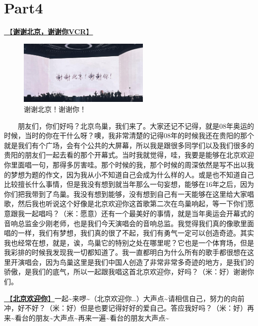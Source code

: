 \documentclass[]{ctexbook}
\begin{document}
\section{Part4}\label{beijing-20240921-part4}

\hyperref[thank-you-vcr]{🎥【\textbf{谢谢北京，谢谢你VCR}】}

\begin{figure}

{\centering \includegraphics[width=180pt]{img/beijing20240921/thank-beijing} 

}

\caption{谢谢北京！谢谢你！}\label{fig:unnamed-chunk-83}
\end{figure}

  朋友们，你们好吗？北京鸟巢，我们来了。大家还记不记得，就是08年奥运的时候，当时的你在干什么呀？噢，我非常清楚的记得08年的时候我还在贵阳的那个就是我们有个广场，会有个公共的大屏幕，所以我是跟很多同学们以及我们很多的贵阳的朋友们一起去看的那个开幕式。当时我就觉得，哇，我要是能够在北京欢迎你里面唱一句，那得多厉害哇。那个时候的我，那个时候的周深依然是写不出以我的梦想为题的作文，因为我从小不知道自己会成为什么样的人。或是也不知道自己比较擅长什么事情，但是我没有想到就当年那么一句妄想，能够在16年之后，因为你们把我带到了鸟巢。我没有想到能够，没有想到自己有一天能够在这里给大家唱歌，然后我也听说这个好像是北京欢迎你这首歌第二次在鸟巢响起，等一下你们愿意跟我一起唱吗？（米：愿意）还有一个最美好的事情，就是当年奥运会开幕式的音响总监金少刚老师，也是我们今天演唱会的音响总监。我觉得我们真的像歌里面唱的一样，我们有梦想，我们真的很了不起，我们有勇气一定可以创造奇迹。其实我也经常在想，就是，诶，鸟巢它的特别之处在哪里呢？它也是一个体育场，但是我彩排的时候我发现我一切都知道了。我一直都明白为什么所有的歌手都很想在这里开演唱会，因为鸟巢这里是我们中国人创造了非常非常多奇迹的地方，是我们的骄傲，是我们的底气，所以一起跟我唱这首北京欢迎你，好吗？（米：好）谢谢你们。

\hyperref[welcome-to-beijing]{🎵【\textbf{北京欢迎你}】}一起\textasciitilde 来啰\textasciitilde（北京欢迎你\ldots）大声点\textasciitilde 请相信自己，努力的向前冲，好不好？（米：好）但是也要记得好好的爱自己。答应我好吗？（米：好）再来\textasciitilde 看台的朋友\textasciitilde 大声点\textasciitilde 再来一遍\textasciitilde 看台的朋友大声点\textasciitilde{}
\end{document}

